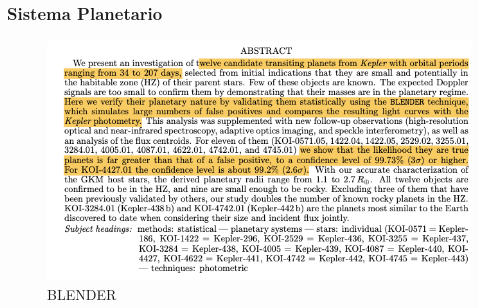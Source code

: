 \documentclass[UKenglish]{beamer}
\begin{document}
\begin{frame}
\frametitle{Sistema Planetario}
\begin{figure}[h!]
    \centering
    \includegraphics[scale=0.45]{Imagenes/8}
    \caption{BLENDER}
    \label{fig:pun2tosja}
    \end{figure}
\end{frame}
\end{document}
